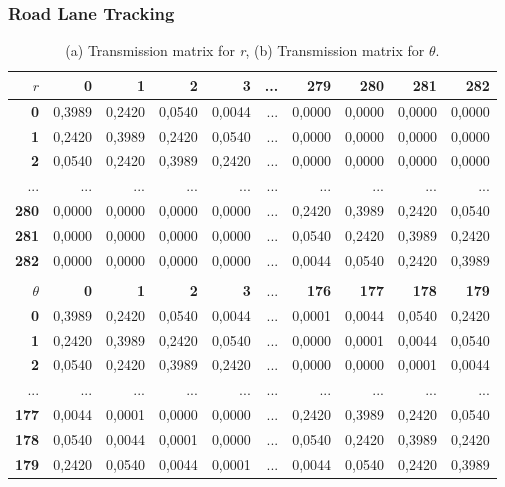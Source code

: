 \documentclass{beamer}
\begin{document}
\frame
{
	\frametitle{Road Lane Tracking}
	\begin{table}
	\caption{(a) Transmission matrix for \textit{r}, (b) Transmission matrix for \textit{$\theta $}.}
	\centering
	{\tiny
	\begin{tabular}{|r|r|r|r|r|r|r|r|r|r|}
	\hline
	{\bf {\normalsize $r$}} & {\bf 0} & {\bf 1} & {\bf 2} & {\bf 3} & ... & {\bf 279} & {\bf 280} & {\bf 281} & {\bf 282} \\
	\hline
	{\bf 0} & 0,3989 & 0,2420 & 0,0540 & 0,0044 & ... & 0,0000 & 0,0000 & 0,0000 & 0,0000 \\
	\hline
	{\bf 1} & 0,2420 & 0,3989 & 0,2420 & 0,0540 & ... & 0,0000 & 0,0000 & 0,0000 & 0,0000 \\
	\hline
	{\bf 2} & 0,0540 & 0,2420 & 0,3989 & 0,2420 & ... & 0,0000 & 0,0000 & 0,0000 & 0,0000 \\
	\hline
	... & ... & ... & ... & ... & ... & ... & ... & ... & ... \\
	\hline
	{\bf 280} & 0,0000 & 0,0000 & 0,0000 & 0,0000 & ... & 0,2420 & 0,3989 & 0,2420 & 0,0540 \\
	\hline
	{\bf 281} & 0,0000 & 0,0000 & 0,0000 & 0,0000 & ... & 0,0540 & 0,2420 & 0,3989 & 0,2420 \\
	\hline
	{\bf 282} & 0,0000 & 0,0000 & 0,0000 & 0,0000 & ... & 0,0044 & 0,0540 & 0,2420 & 0,3989 \\
	\hline
	\multicolumn{10}{c}{} \\
	\hline
	{\bf {\normalsize $\theta$}} & {\bf 0} & {\bf 1} & {\bf 2} & {\bf 3} & ... & {\bf 176} & {\bf 177} & {\bf 178} & {\bf 179} \\
	\hline
	{\bf 0} & 0,3989 & 0,2420 & 0,0540 & 0,0044 & ... & 0,0001 & 0,0044 & 0,0540 & 0,2420 \\
	\hline
	{\bf 1} & 0,2420 & 0,3989 & 0,2420 & 0,0540 & ... & 0,0000 & 0,0001 & 0,0044 & 0,0540 \\
	\hline
	{\bf 2} & 0,0540 & 0,2420 & 0,3989 & 0,2420 & ... & 0,0000 & 0,0000 & 0,0001 & 0,0044 \\
	\hline
	... & ... & ... & ... & ... & ... & ... & ... & ... & ... \\
	\hline
	{\bf 177} & 0,0044 & 0,0001 & 0,0000 & 0,0000 & ... & 0,2420 & 0,3989 & 0,2420 & 0,0540 \\
	\hline
	{\bf 178} & 0,0540 & 0,0044 & 0,0001 & 0,0000 & ... & 0,0540 & 0,2420 & 0,3989 & 0,2420 \\
	\hline
	{\bf 179} & 0,2420 & 0,0540 & 0,0044 & 0,0001 & ... & 0,0044 & 0,0540 & 0,2420 & 0,3989 \\
	\hline
	\end{tabular}  
	}
	\label{tab:ldtable3}
	\end{table}	
}
\end{document}
